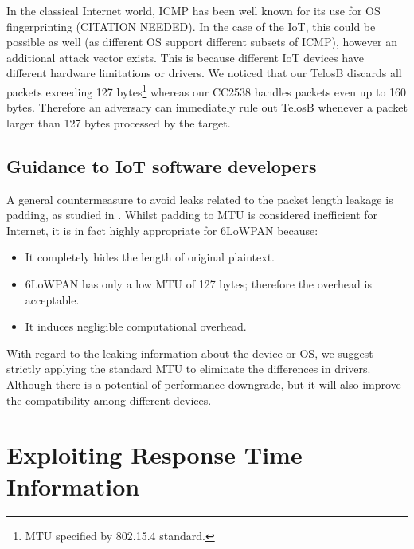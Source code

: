 \documentclass{article}
\begin{document}
In the classical Internet world, ICMP has been well known for its use for OS fingerprinting (CITATION NEEDED). In the case of the IoT, this could be possible as well (as different OS support different subsets of ICMP), however an additional attack vector exists. This is because different IoT devices have different hardware limitations or drivers. We noticed that our TelosB\cite{TelosB} discards all packets exceeding 127 bytes\footnote{MTU specified by 802.15.4 standard.} whereas our CC2538 handles packets even up to 160 bytes. Therefore an adversary can immediately rule out TelosB whenever a packet larger than 127 bytes processed by the target.

\subsection{Guidance to IoT software developers}
%
A general countermeasure to avoid leaks related to the packet length leakage is padding, as studied in \cite{Peekaboo}. Whilst padding to MTU is considered inefficient for Internet, it is in fact highly appropriate for 6LoWPAN because:
\begin{itemize}
	\item It completely hides the length of original plaintext.
	\item 6LoWPAN has only a low MTU of 127 bytes; therefore the overhead is acceptable.
	\item It induces negligible computational overhead.
\end{itemize}


With regard to the leaking information about the device or OS, we suggest strictly applying the standard MTU to eliminate the differences in drivers. Although there is a potential of performance downgrade, but it will also improve the compatibility among different devices.


\section{Exploiting Response Time Information}
\end{document}
